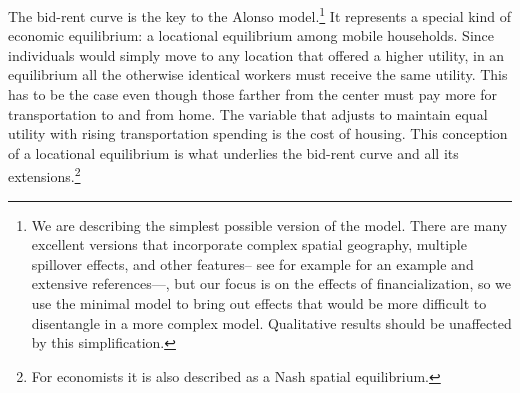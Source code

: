  The \gls{bid-rent curve} is the key to the Alonso model.\footnote{We are describing the simplest possible version of the model. There are many excellent versions that incorporate complex spatial geography, multiple spillover effects, and other features-- see for example \cite{ahlfeldtECONOMICSDENSITYEVIDENCE2015} for an example and extensive references---, but our focus is on the effects of financialization, so we use the minimal model to bring out effects that would be more difficult to disentangle in a more complex model. Qualitative results should be unaffected by this simplification.}  It represents a special  kind of economic equilibrium:   a locational equilibrium among mobile households. Since individuals would simply move to any location that offered a higher utility, in an equilibrium all the otherwise identical workers must receive the same utility. This has to be the case even though those farther from the center must pay more for transportation to and from home. The variable that  adjusts to maintain equal utility with rising transportation spending is the cost of housing. This conception of a \gls{locational equilibrium} is what underlies the bid-rent curve and all its extensions.\footnote{For economists it is also described as a Nash spatial equilibrium.}








